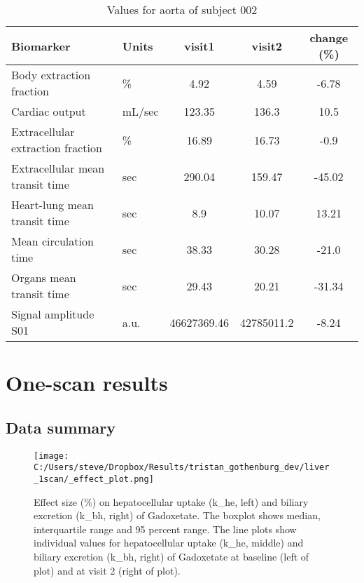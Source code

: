 \documentclass{epflreport}%
\begin{document}
%


\begin{table}[h!]%
\centering%
\begin{tabular}{llccc}%
\hline%
Biomarker&Units&visit1&visit2&change (\%)\\%
\hline%
Body extraction fraction&\%&4.92&4.59&{-}6.78\\%
Cardiac output&mL/sec&123.35&136.3&10.5\\%
Extracellular extraction fraction&\%&16.89&16.73&{-}0.9\\%
Extracellular mean transit time&sec&290.04&159.47&{-}45.02\\%
Heart{-}lung mean transit time&sec&8.9&10.07&13.21\\%
Mean circulation time&sec&38.33&30.28&{-}21.0\\%
Organs mean transit time&sec&29.43&20.21&{-}31.34\\%
Signal amplitude S01&a.u.&46627369.46&42785011.2&{-}8.24\\%
\hline%
\end{tabular}%
\caption{Values for aorta of subject 002}%
\end{table}

%
\clearpage%
\chapter{One{-}scan results}%
\section{Data summary}%
\label{sec:Datasummary}%


\begin{figure}[h!]%
\centering%
\centering%
\texttt{[image: C:/Users/steve/Dropbox/Results/tristan\_gothenburg\_dev/liver\_1scan/\_effect\_plot.png]}%
\caption{Effect size (\%) on hepatocellular uptake (k\_he, left) and biliary excretion (k\_bh, right) of Gadoxetate. The boxplot shows median, interquartile range and 95 percent range. The line plots show individual values for hepatocellular uptake (k\_he, middle) and biliary excretion (k\_bh, right) of Gadoxetate at baseline (left of plot) and at visit 2 (right of plot).}%
\end{figure}

%
\end{document}
